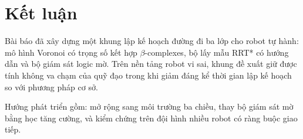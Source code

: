 
\section{Kết luận}

Bài báo đã xây dựng một khung lập kế hoạch đường đi ba lớp cho robot tự
hành: mô hình Voronoi có trọng số kết hợp $\beta$-complexes, bộ lấy mẫu
RRT* có hướng dẫn và bộ giám sát logic mờ. Trên nền tảng robot vi sai, khung
đề xuất giữ được tính không va chạm của quỹ đạo trong khi giảm đáng kể thời
gian lập kế hoạch so với phương pháp cơ sở.

Hướng phát triển gồm: mở rộng sang môi trường ba chiều, thay bộ giám sát mờ
bằng học tăng cường, và kiểm chứng trên đội hình nhiều robot có ràng buộc
giao tiếp.
